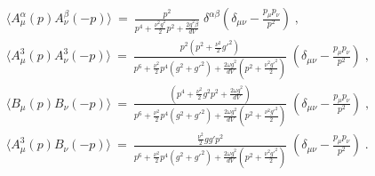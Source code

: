 \begin{subequations} \label{propsaandb} \begin{gather}
\langle  A^{\alpha}_\mu(p) A^{\beta}_\nu(-p) \rangle ~=~ \frac{p^2}{p^4 + \frac{\nu^2g^2}{2} p^2 + \frac{2g^2\beta}{dV}} \; \delta^{\alpha \beta} \left( \delta_{\mu\nu} - \frac{p_\mu p_\nu}{p^2} \right)  \;,   
\label{aalpha} \\
\langle  A^{3}_\mu(p) A^{3}_\nu(-p) \rangle ~=~ \frac{p^2 \left(p^2 +\frac{\nu^2}{2} g'^{2}\right)}{p^6 + \frac{\nu^2}{2} p^4 \left(g^2 +g'^2 \right)  + \frac{2\omega g^2}{dV} \left( p^2 + \frac{\nu^2 g'^2}{2} \right)} \;  \left( \delta_{\mu\nu} - \frac{p_\mu p_\nu}{p^2} \right)  \;,   \label{a3a3}
\\ %
\langle  B_\mu(p) B_\nu(-p) \rangle ~=~ \frac{ \left(p^4 +\frac{\nu^2}{2} g^{2} p^2+\frac{2\omega g^2}{dV}  \right)}{p^6 + \frac{\nu^2}{2} p^4 \left(g^2 +g'^2 \right)  + \frac{2\omega g^2}{dV} \left( p^2 +  \frac{\nu^2 g'^2}{2} \right)} \;  \left( \delta_{\mu\nu} - \frac{p_\mu p_\nu}{p^2} \right)  \;,   \label{bb}
\\
\langle  A^3_\mu(p) B_\nu(-p) \rangle ~=~  \frac{ \frac{\nu^2}{2} g g'  p^2}{p^6 + \frac{\nu^2}{2} p^4 \left(g^2 +g'^2 \right)  + \frac{2\omega g^2}{dV} \left( p^2 + \frac{\nu^2 g'^2}{2} \right)} \;  \left( \delta_{\mu\nu} - \frac{p_\mu p_\nu}{p^2} \right)  \;.   \label{ba3}
\end{gather} \end{subequations}
